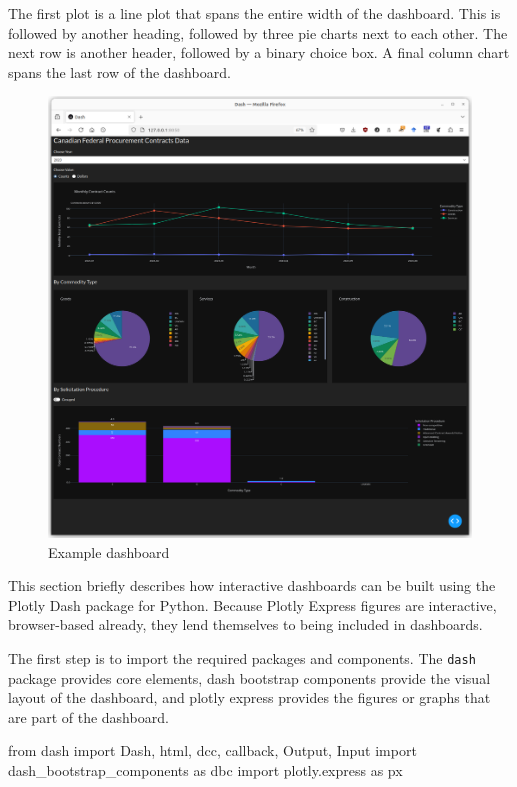 The first plot is a line plot that spans the entire width of the dashboard. This is followed by another heading, followed by three pie charts next to each other. The next row is another header, followed by a binary choice box. A final column chart spans the last row of the dashboard.

\begin{figure}
\centering

  \includegraphics[width=\textwidth]{dashboard.png}
  \caption{Example dashboard}
  \label{fig:dashboard}
\end{figure}

This section briefly describes how interactive dashboards can be built using the Plotly Dash package for Python. Because Plotly Express figures are interactive, browser-based already, they lend themselves to being included in dashboards. 

The first step is to import the required packages and components. The \texttt{dash} package provides core elements, dash bootstrap components provide the visual layout of the dashboard, and plotly express provides the figures or graphs that are part of the dashboard.

\begin{pythoncode}
from dash import Dash, html, dcc, callback, Output, Input
import dash_bootstrap_components as dbc
import plotly.express as px
\end{pythoncode}

